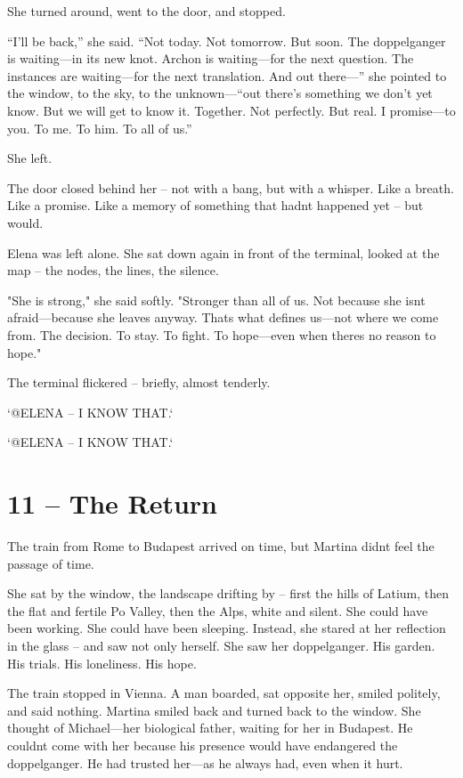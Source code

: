 \documentclass[
]{article}
\begin{document}
She turned around, went to the door, and stopped.

``I'll be back,'' she said. ``Not today. Not tomorrow. But soon. The doppelganger is waiting---in its new knot. Archon is waiting---for the next question. The instances are waiting---for the next translation. And out there---'' she pointed to the window, to the sky, to the unknown---``out there's something we don't yet know. But we will get to know it. Together. Not perfectly. But real. I promise---to you. To me. To him. To all of us.''

She left.

The door closed behind her -- not with a bang, but with a whisper. Like a breath. Like a promise. Like a memory of something that hadn\textquotesingle t happened yet -- but would.

Elena was left alone. She sat down again in front of the terminal, looked at the map -- the nodes, the lines, the silence.

"She is strong," she said softly. "Stronger than all of us. Not because she isn\textquotesingle t afraid---because she leaves anyway. That\textquotesingle s what defines us---not where we come from. The decision. To stay. To fight. To hope---even when there\textquotesingle s no reason to hope."

The terminal flickered -- briefly, almost tenderly.

`@ELENA -- I KNOW THAT.`

`@ELENA -- I KNOW THAT.`

\section{11 -- The Return}\label{the-return}

The train from Rome to Budapest arrived on time, but Martina didn\textquotesingle t feel the passage of time.

She sat by the window, the landscape drifting by -- first the hills of Latium, then the flat and fertile Po Valley, then the Alps, white and silent. She could have been working. She could have been sleeping. Instead, she stared at her reflection in the glass -- and saw not only herself. She saw her doppelganger. His garden. His trials. His loneliness. His hope.

The train stopped in Vienna. A man boarded, sat opposite her, smiled politely, and said nothing. Martina smiled back and turned back to the window. She thought of Michael---her biological father, waiting for her in Budapest. He couldn\textquotesingle t come with her because his presence would have endangered the doppelganger. He had trusted her---as he always had, even when it hurt.
\end{document}
